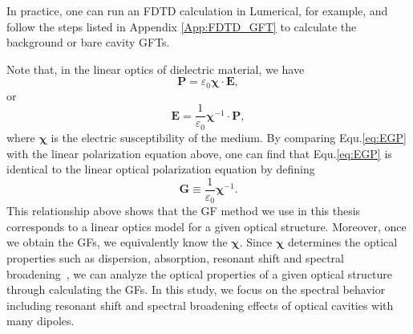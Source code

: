 In practice, one can run an FDTD calculation in Lumerical, for example, and follow the steps listed in Appendix \ref{App:FDTD_GFT} to calculate the background or bare cavity GFTs.

Note that, in the linear optics of dielectric material, we have~\cite{Boyd2003}
\begin{equation}
\mathbf{P}=\varepsilon_0\mathbf{\chi} \cdot \mathbf{E},
\end{equation}
or
\begin{equation}\label{eq:polarization}
\mathbf{E}=\frac{1}{\varepsilon_0}\mathbf{\chi}^{-1} \cdot \mathbf{P},
\end{equation}
where $\mathbf{\chi}$ is the electric susceptibility of the medium.
By comparing Equ.\eqref{eq:EGP} with the linear polarization equation above, one can find that Equ.\eqref{eq:EGP} is identical to the linear optical polarization equation by defining
\begin{equation}
\mathbf{G}\equiv \frac{1}{\varepsilon_0}\mathbf{\chi}^{-1}.
\end{equation}
This relationship above shows that the GF method we use in this thesis corresponds to a linear optics model for a given optical structure. Moreover, once we obtain the GFs, we equivalently know the $\mathbf{\chi}$. Since $\mathbf{\chi}$ determines the optical properties such as dispersion, absorption, resonant shift and spectral broadening~\cite{Boyd2003,Cohen-Tannoudji1998,Haug1990,Maier2007,Novotny2006,Gerry2005,Sakoda2005}, we can analyze the optical properties of a given optical structure through calculating the GFs. In this study, we focus on the spectral behavior including resonant shift and spectral broadening effects of optical cavities with many dipoles.

